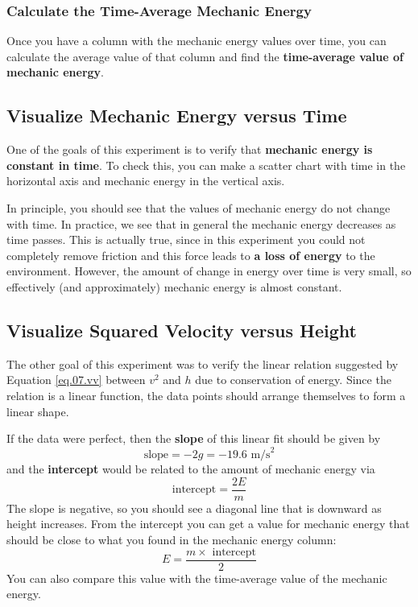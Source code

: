 \subsubsection{Calculate the Time-Average Mechanic Energy}
%
Once you have a column with the mechanic energy values over time, you can calculate the average value of that column and find the \textbf{time-average value of mechanic energy}.
%
\subsection{Visualize Mechanic Energy versus Time}
%
One of the goals of this experiment is to verify that \textbf{mechanic energy is constant in time}. To check this, you can make a scatter chart with time in the horizontal axis and mechanic energy in the vertical axis.

In principle, you should see that the values of mechanic energy do not change with time. In practice, we see that in general the mechanic energy decreases as time passes. This is actually true, since in this experiment you could not completely remove friction and this force leads to \textbf{a loss of energy} to the environment. However, the amount of change in energy over time is very small, so effectively (and approximately) mechanic energy is almost constant.
%
\subsection{Visualize Squared Velocity versus Height}
%
The other goal of this experiment was to verify the linear relation suggested by Equation \ref{eq.07.vv} between $v^{2}$ and $h$ due to conservation of energy. Since the relation is a linear function, the data points should arrange themselves to form a linear shape.

If the data were perfect, then the \textbf{slope} of this linear fit should be given by
\begin{equation} \label{eq.07.slope}
    \text{slope} = -2g = -19.6 \text{ m/s}^{2}
\end{equation}
and the \textbf{intercept} would be related to the amount of mechanic energy via
\begin{equation}
    \text{intercept} = \frac{2 E}{m}
\end{equation}
The slope is negative, so you should see a diagonal line that is downward as height increases. From the intercept you can get a value for mechanic energy that should be close to what you found in the mechanic energy column:
\begin{equation} \label{eq.07.intercept}
    E = \frac{m \times \text{ intercept}}{2}
\end{equation}
You can also compare this value with the time-average value of the mechanic energy.
%
